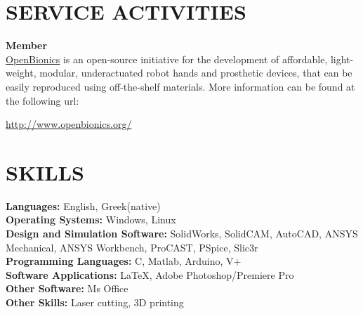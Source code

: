 \documentclass[11pt]{res} %
\begin{document}
\begin{resume}
\section{SERVICE ACTIVITIES} 

\vspace{5pt} %

\small\textbf{Member}\\
\underline{OpenBionics} is an open-source initiative for the development of affordable, light-weight, modular, underactuated
robot hands and prosthetic devices, that can be easily reproduced using off-the-shelf materials. More information can be found at the following url:\begin {center}\url{http://www.openbionics.org/}
\end {center}


\vspace{0in} %




\section{SKILLS} 

\vspace{5pt} %

\small \textbf  {Languages:} English, Greek(native) \\
\small \textbf  {Operating Systems:} Windows, Linux \\
\small \textbf {Design and Simulation Software:}
SolidWorks, SolidCAM, AutoCAD, ANSYS Mechanical, ANSYS Workbench, ProCAST, PSpice, Slic3r\\
\small \textbf {Programming Languages:} C, Matlab, Arduino, V+ \\
\small \textbf {Software Applications:} \LaTeX, Adobe Photoshop/Premiere Pro\\
\small \textbf {Other Software:} Ms Office\\
\small \textbf {Other Skills:} Laser cutting, 3D printing


\end{resume}
\end{document}
